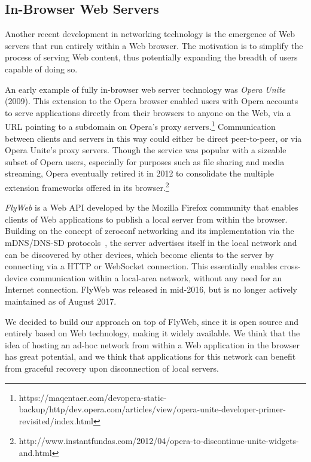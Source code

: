 \subsection{In-Browser Web Servers}
\label{sub:background_in_browser_web_servers}

Another recent development in networking technology is the emergence of Web servers that run entirely within a Web browser. 
The motivation is to simplify the process of serving Web content, thus potentially expanding the breadth of users capable of doing so.

An early example of fully in-browser web server technology was \textit{Opera Unite} (2009).
This extension to the Opera browser enabled users with Opera accounts to serve applications directly from their browsers to anyone on the Web, via a URL pointing to a subdomain on Opera's proxy servers.\footnote{https://maqentaer.com/devopera-static-backup/http/dev.opera.com/articles/view/opera-unite-developer-primer-revisited/index.html}
Communication between clients and servers in this way could either be direct peer-to-peer, or via Opera Unite's proxy servers.
Though the service was popular with a sizeable subset of Opera users, especially for purposes such as file sharing and media streaming, Opera eventually retired it in 2012 to consolidate the multiple extension frameworks offered in its browser.\footnote{http://www.instantfundas.com/2012/04/opera-to-discontinue-unite-widgets-and.html}

\textit{FlyWeb} is a Web API developed by the Mozilla Firefox community that enables clients of Web applications to publish a local server from within the browser.
Building on the concept of zeroconf networking and its implementation via the mDNS/DNS-SD protocols~\cite{rfc6762, rfc6763}, the server advertises itself in the local network and can be discovered by other devices, which become clients to the server by connecting via a HTTP or WebSocket connection.
This essentially enables cross-device communication within a local-area network, without any need for an Internet connection.
FlyWeb was released in mid-2016, but is no longer actively maintained as of August 2017.

We decided to build our approach on top of FlyWeb, since it is open source and entirely based on Web technology, making it widely available.
We think that the idea of hosting an ad-hoc network from within a Web application in the browser has great potential, and we think that applications for this network can benefit from graceful recovery upon disconnection of local servers.
